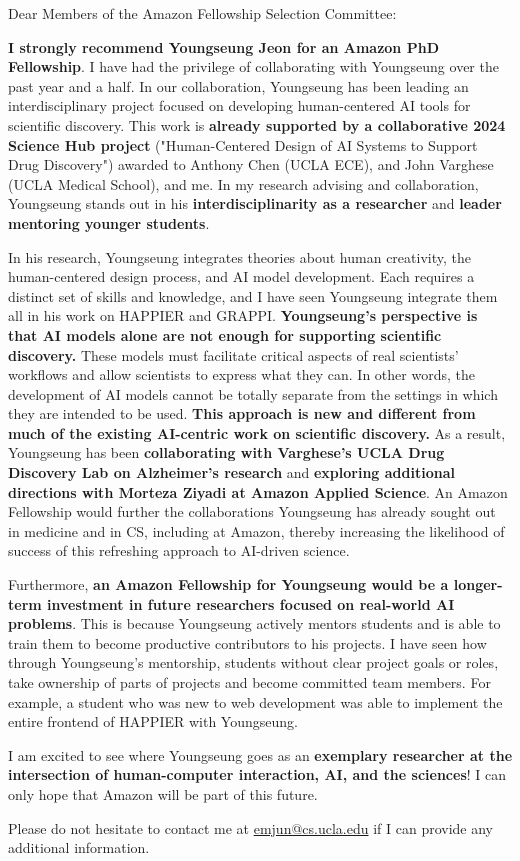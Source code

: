 Dear Members of the Amazon Fellowship Selection Committee:

\textbf{I strongly recommend Youngseung Jeon for an Amazon PhD Fellowship}. I
have had the privilege of collaborating with Youngseung over the past year and a
half. In our collaboration, Youngseung has been leading an interdisciplinary
project focused on developing human-centered AI tools for scientific discovery.
This work is \textbf{already supported by a collaborative 2024 Science Hub
project} ("Human-Centered Design of AI Systems to Support Drug Discovery")
awarded to Anthony Chen (UCLA ECE), and John Varghese (UCLA Medical School), and
me. In my research advising and collaboration, Youngseung stands out in his
\textbf{interdisciplinarity as a researcher} and \textbf{leader mentoring
younger students}.

In his research, Youngseung integrates theories about human creativity, the
human-centered design process, and AI model development. Each requires a
distinct set of skills and knowledge, and I have seen Youngseung integrate them
all in his work on HAPPIER and GRAPPI. \textbf{Youngseung's perspective is that
AI models alone are not enough for supporting scientific discovery.} These
models must facilitate critical aspects of real scientists' workflows and allow
scientists to express what they can. In other words, the development of AI
models cannot be totally separate from the settings in which they are intended
to be used. \textbf{This approach is new and different from much of the existing
AI-centric work on scientific discovery.} As a result, Youngseung has been
\textbf{collaborating with Varghese's UCLA Drug Discovery Lab on Alzheimer's research}
and \textbf{exploring additional directions with Morteza Ziyadi at Amazon
Applied Science}. An Amazon Fellowship would further the collaborations
Youngseung has already sought out in medicine and in CS, including at Amazon,
thereby increasing the likelihood of success of this refreshing approach to
AI-driven science. 

Furthermore, \textbf{an Amazon Fellowship for Youngseung would be a longer-term
investment in future researchers focused on real-world AI problems}. This is
because Youngseung actively mentors students and is able to train them to become
productive contributors to his projects. I have seen how through Youngseung's
mentorship, students without clear project goals or roles, take ownership of
parts of projects and become committed team members. For example, a student who
was new to web development was able to implement the entire frontend of HAPPIER
with Youngseung.

I am excited to see where Youngseung goes as an \textbf{exemplary researcher at
the intersection of human-computer interaction, AI, and the sciences}! I can
only hope that Amazon will be part of this future. 

Please do not hesitate to contact me at \href{mailto:emjun@cs.ucla.edu}{emjun@cs.ucla.edu} if I can provide any additional information.